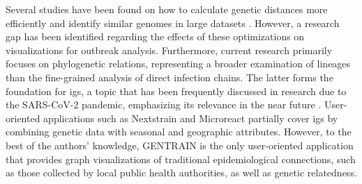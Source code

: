 Several studies have been found on how to calculate genetic distances more efficiently and identify similar genomes in large datasets \cite{Gra1,Mar2,Zha2,Mus1}. However, a research gap has been identified regarding the effects of these optimizations on visualizations for outbreak analysis. Furthermore, current research primarily focuses on phylogenetic relations, representing a broader examination of lineages than the fine-grained analysis of direct infection chains. The latter forms the foundation for \acrshort{igs}, a topic that has been frequently discussed in research due to the SARS-CoV-2 pandemic, emphasizing its relevance in the near future \cite{Wal1, Wal2, Blu1, Han1}. User-oriented applications such as Nextstrain and Microreact partially cover \acrshort{igs} by combining genetic data with seasonal and geographic attributes. However, to the best of the authors' knowledge, GENTRAIN is the only user-oriented application that provides graph visualizations of traditional epidemiological connections, such as those collected by local public health authorities, as well as genetic relatedness.